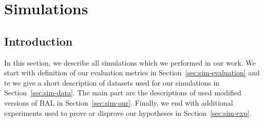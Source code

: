 
\section{Simulations}
\label{sec:simulations} 

\subsection*{Introduction} 
In this section, we describe all simulations which we performed in our work. We start with definition of our evaluation metrics in Section~\ref{sec:sim-evaluation} and te we give a short description of datasets used for our simulations in Section~\ref{sec:sim-data}. The main part are the descriptions of used modified versions of BAL in Section~\ref{sec:sim-our}. Finally, we end with additional experiments used to prove or disprove our hypotheses in Section~\ref{sec:sim-exp}.

 



 

 
